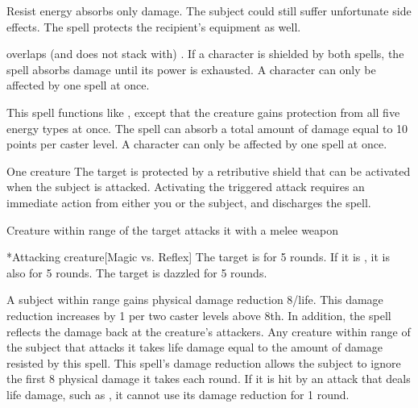 Resist energy absorbs only damage. The subject could still suffer unfortunate side effects. The spell protects the recipient's equipment as well.
\par {} overlaps (and does not stack with) . If a character is shielded by both spells, the  spell absorbs damage until its power is exhausted. A character can only be affected by one  spell at once.

\spelleffect This spell functions like , except that the creature gains protection from all five energy types at once. The spell can absorb a total amount of damage equal to 10 points per caster level.
\spellnotes A character can only be affected by one  spell at once.

\begin{spelltarget}{One creature}
    \spelleffect The target is protected by a retributive shield that can be activated when the subject is attacked. Activating the triggered attack requires an immediate action from either you or the subject, and discharges the spell.
    \begin{spelltrigger}{Creature within \rngclose range of the target attacks it with a melee weapon}
        \begin{spelltarget}*{Attacking creature}[Magic vs. Reflex]
            \spellsuccess The target is \dazzled for 5 rounds. If it is \bloodied, it is also \blinded for 5 rounds.
            \spellfailure The target is dazzled for 5 rounds.
        \end{spelltarget}
    \end{spelltrigger}
\end{spelltarget}

\spelldur{\durshort}
\spelleffect A subject within \rngclose range gains physical damage reduction 8/life. This damage reduction increases by 1 per two caster levels above 8th. In addition, the spell reflects the damage back at the creature's attackers. Any creature within \rngmed range of the subject that attacks it takes life damage equal to the amount of damage resisted by this spell.
\spellnotes This spell's damage reduction allows the subject to ignore the first 8 physical damage it takes each round. If it is hit by an attack that deals life damage, such as , it cannot use its damage reduction for 1 round.

